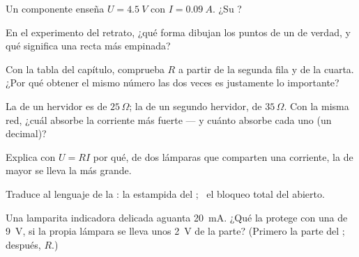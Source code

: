 \begin{exercise}[$\star$]\label{exo:g8:ohms-law:3}
Un componente enseña $U = \qty{4.5}{V}$ con $I = \qty{0.09}{A}$. ¿Su
?
\end{exercise}

\begin{exercise}[$\star$]\label{exo:g8:ohms-law:4}
En el experimento del retrato, ¿qué forma dibujan los puntos de un
 de verdad, y qué significa una recta más empinada?
\end{exercise}

\begin{exercise}[$\star$]\label{exo:g8:ohms-law:5}
Con la tabla del capítulo, comprueba $R$ a partir de la segunda fila y
de la cuarta. ¿Por qué obtener el mismo número las dos veces es
justamente lo importante?
\end{exercise}

\begin{exercise}[$\star$]\label{exo:g8:ohms-law:6}
La  de un hervidor es de $25\,\Omega$; la de un segundo
hervidor, de $35\,\Omega$. Con la misma red, ¿cuál absorbe la corriente
más fuerte --- y cuánto absorbe cada uno (un decimal)?
\end{exercise}

\begin{exercise}[$\star$]\label{exo:g8:ohms-law:7}
Explica con $U = R I$ por qué, de dos lámparas  que comparten
una corriente, la de mayor  se lleva la
 más grande.
\end{exercise}

\begin{exercise}[$\star$]\label{exo:g8:ohms-law:8}
Traduce al lenguaje de la : la estampida del
; \ el bloqueo total del 
abierto.
\end{exercise}

\begin{exercise}[$\star\star$]\label{exo:g8:ohms-law:9}
Una lamparita indicadora delicada aguanta \qty{20}{mA}. ¿Qué
  la protege con una  de
\qty{9}{V}, si la propia lámpara se lleva unos \qty{2}{V} de la parte?
(Primero la parte del ; después, $R$.)
\end{exercise}

